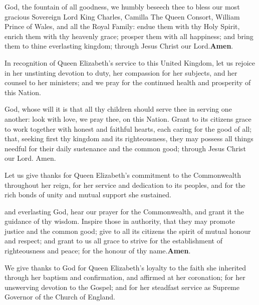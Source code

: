  God, the fountain of all goodness, we humbly beseech thee to bless
our most gracious Sovereign Lord King Charles, Camilla The Queen Consort,
William Prince of Wales, and all the Royal Family: endue them with thy Holy Spirit,
enrich them with thy heavenly grace; prosper them with all happiness; and bring them
to thine everlasting kingdom; through Jesus Christ our Lord.\textbf{Amen}.



In recognition of Queen Elizabeth’s service to this United Kingdom, let us rejoice in
her unstinting devotion to duty, her compassion for her subjects, and her counsel to her
ministers; and we pray for the continued health and prosperity of this Nation.

 God, whose will it is that all thy children should serve thee in serving
one another: look with love, we pray thee, on this Nation. Grant to its citizens
grace to work together with honest and faithful hearts, each caring for the good of all;
that, seeking first thy kingdom and its righteousness, they may possess all things needful
for their daily sustenance and the common good; through Jesus Christ our Lord.
Amen.



Let us give thanks for Queen Elizabeth’s commitment to the Commonwealth
throughout her reign, for her service and dedication to its peoples, and for the rich
bonds of unity and mutual support she sustained.

 and everlasting God, hear our prayer for the Commonwealth, and
grant it the guidance of thy wisdom. Inspire those in authority, that they may
promote justice and the common good; give to all its citizens the spirit of mutual honour
and respect; and grant to us all grace to strive for the establishment of righteousness
and peace; for the honour of thy name.\textbf{Amen}.



We give thanks to God for Queen Elizabeth’s loyalty to the faith she inherited through
her baptism and confirmation, and affirmed at her coronation; for her unswerving
devotion to the Gospel; and for her steadfast service as Supreme Governor of the
Church of England.

